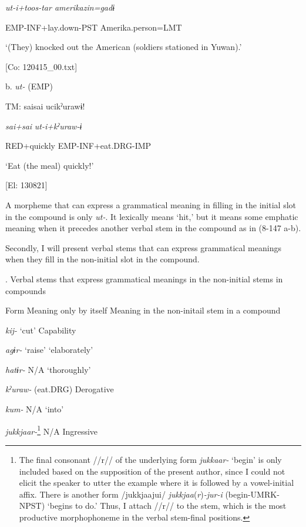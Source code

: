       \textit{ut{}-i+toos-tar  amerikazin=gadɨ}

      EMP-INF+lay.down-PST  Amerika.person=LMT

      ‘(They) knocked out the American (soldiers stationed in Yuwan).’

      [Co: 120415\_00.txt]

  b.  \textit{ut-} (EMP)

    TM:  saisai  ucikˀurawɨ!

      \textit{sai+sai}  \textit{ut{}-i+kˀuraw-ɨ}

      RED+quickly  EMP-INF+eat.DRG-IMP

      ‘Eat (the meal) quickly!’

      [El: 130821]

A morpheme that can express a grammatical meaning in filling in the initial slot in the compound is only \textit{ut-}. It lexically means ‘hit,’ but it means some emphatic meaning when it precedes another verbal stem in the compound as in (8-147 a-b).

  Secondly, I will present verbal stems that can express grammatical meanings when they fill in the non-initial slot in the compound.

\begin{styleBeschriftung}
\textmd{}\textmd{. Verbal stems that express grammatical meanings in the non-initial stems in} \textmd{compounds}
\end{styleBeschriftung}

Form    Meaning only by itself    Meaning in the non-initail stem in a compound

\textit{kij-}    ‘cut’    Capability

\textit{agɨr-}    ‘raise’    ‘elaborately’

\textit{hatɨr-}    N/A    ‘thoroughly’

\textit{kˀuraw-}    (eat.DRG)    Derogative

\textit{kum-}    N/A    ‘into’

\textit{jukkjaar-}\footnote{The final consonant //r// of the underlying form \textit{jukkaar-} ‘begin’ is only included based on the supposition of the present author, since I could not elicit the speaker to utter the example where it is followed by a vowel-initial affix. There is another form /jukkjaajui/ \textit{jukkjaa}(\textit{r})\textit{{}-jur-i} (begin-UMRK-NPST) ‘begins to do.’ Thus, I attach //r// to the stem, which is the most productive morphophoneme in the verbal stem-final positions.}    N/A    Ingressive

